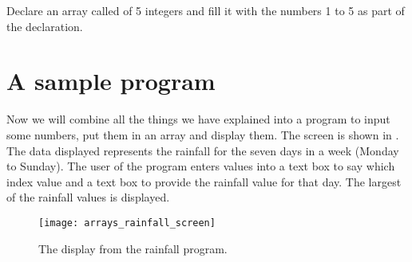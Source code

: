 		\begin{stqb}
			\begin{STQ}
				\item	Declare an array called  of 5 integers and fill it with the numbers 1 to 5 as part of the declaration.
			\end{STQ}
		\end{stqb}


	\section{A sample program}
		Now we will combine all the things we have explained into a program to input some numbers, put them in an array and display them. The screen is shown in . The data displayed represents the rainfall for the seven days in a week (Monday to Sunday). The user of the program enters values into a text box to say which index value and a text box to provide the rainfall value for that day. The largest of the rainfall values is displayed.
		\begin{figure}[bth]
			\centering
			\texttt{[image: arrays\_rainfall\_screen]}
			\caption{The display from the rainfall program.}
			\label{fig:arrays_rainfall_screen}
		\end{figure}

